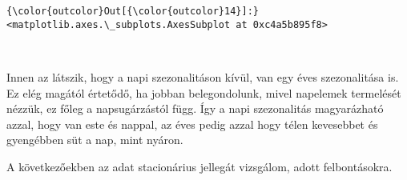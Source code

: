 \documentclass[11pt]{article}
\begin{document}
\begin{Verbatim}[commandchars=\\\{\}]
{\color{outcolor}Out[{\color{outcolor}14}]:} <matplotlib.axes.\_subplots.AxesSubplot at 0xc4a5b895f8>
\end{Verbatim}
            
    \begin{center}
    \end{center}
    { \hspace*{\fill} \\}
    
    Innen az látszik, hogy a napi szezonalitáson kívül, van egy éves
szezonalitása is. Ez elég magától értetődő, ha jobban belegondolunk,
mivel napelemek termelését nézzük, ez főleg a napsugárzástól függ. Így a
napi szezonalitás magyarázható azzal, hogy van este és nappal, az éves
pedig azzal hogy télen kevesebbet és gyengébben süt a nap, mint nyáron.

    A következőekben az adat stacionárius jellegát vizsgálom, adott
felbontásokra.
\end{document}
